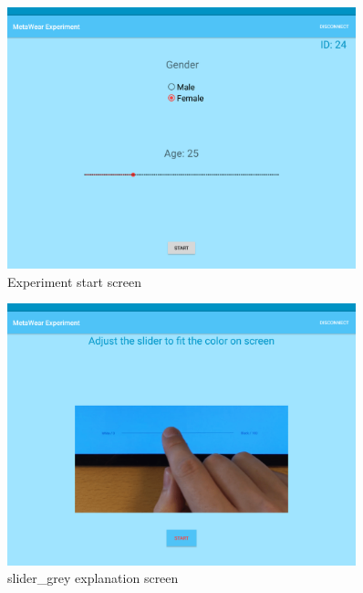 \begin{figure}[h!]
\centering
\includegraphics[width=0.9\textwidth]{figures/tablet_screen5.png}
\caption{Experiment start screen}
\label{appendix_app_screen_5}
\end{figure}

\begin{figure}[h!]
\centering
\includegraphics[width=0.9\textwidth]{figures/tablet_screen6.png}
\caption{slider\_grey explanation screen}
\label{appendix_app_screen_6}
\end{figure}

